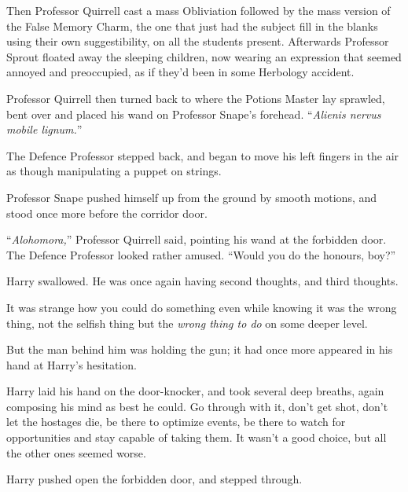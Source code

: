 Then Professor Quirrell cast a mass Obliviation followed by the mass version of the False Memory Charm, the one that just had the subject fill in the blanks using their own suggestibility, on all the students present. Afterwards Professor Sprout floated away the sleeping children, now wearing an expression that seemed annoyed and preoccupied, as if they’d been in some Herbology accident.

Professor Quirrell then turned back to where the Potions Master lay sprawled, bent over and placed his wand on Professor Snape’s forehead. “\emph{Alienis nervus mobile lignum.}”

The Defence Professor stepped back, and began to move his left fingers in the air as though manipulating a puppet on strings.

Professor Snape pushed himself up from the ground by smooth motions, and stood once more before the corridor door.

“\emph{Alohomora,}” Professor Quirrell said, pointing his wand at the forbidden door. The Defence Professor looked rather amused. “Would you do the honours, boy?”

Harry swallowed. He was once again having second thoughts, and third thoughts.

It was strange how you could do something even while knowing it was the wrong thing, not the selfish thing but the \emph{wrong thing to do} on some deeper level.

But the man behind him was holding the gun; it had once more appeared in his hand at Harry’s hesitation.

Harry laid his hand on the door-knocker, and took several deep breaths, again composing his mind as best he could. Go through with it, don’t get shot, don’t let the hostages die, be there to optimize events, be there to watch for opportunities and stay capable of taking them. It wasn’t a good choice, but all the other ones seemed worse.

Harry pushed open the forbidden door, and stepped through.
